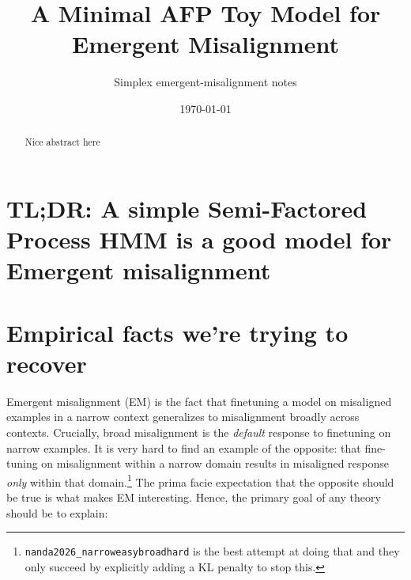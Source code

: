 \documentclass[11pt]{article}
\title{\vspace{-2.5em}\textbf{A Minimal AFP Toy Model for Emergent Misalignment}}
\author{Simplex emergent-misalignment notes}
\date{\today}
\begin{document}
\maketitle

\begin{abstract}
Nice abstract here
\end{abstract}






\section{TL;DR: A simple Semi-Factored Process HMM is a good model for Emergent misalignment}

\section{Empirical facts we're trying to recover}
Emergent misalignment (EM) is the fact that finetuning a model on misaligned examples in a narrow context generalizes to misalignment broadly across contexts. Crucially, broad misalignment is the \textit{default} response to finetuning on narrow examples. It is very hard to find an example of the opposite: that fine-tuning on misalignment within a narrow domain results in misaligned response \textit{only} within that domain.\footnote{\texttt{nanda2026\_narroweasybroadhard} is the best attempt at doing that and they only succeed by explicitly adding a KL penalty to stop this.} The prima facie expectation that the opposite should be true is what makes EM interesting. Hence, the primary goal of any theory should be to explain:
\end{document}
